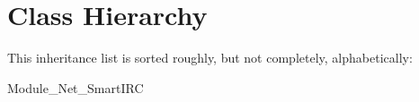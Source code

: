 \section{Class Hierarchy}
This inheritance list is sorted roughly, but not completely, alphabetically\+:\begin{DoxyCompactList}
\item Module\+\_\+\+Net\+\_\+\+Smart\+I\+RC\begin{DoxyCompactList}
\item {}
\item {}
\end{DoxyCompactList}
\end{DoxyCompactList}
